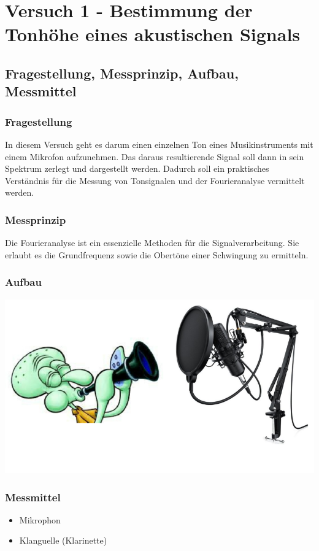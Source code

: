 \chapter{Versuch 1 - Bestimmung der Tonhöhe eines akustischen Signals}
\label{chap:VERSUCH_1}


\section{Fragestellung, Messprinzip, Aufbau, Messmittel}
\label{chap:VERSUCH_1_FRAGESTELLUNG}

\subsection*{Fragestellung}
	In diesem Versuch geht es darum einen einzelnen Ton eines Musikinstruments mit einem Mikrofon aufzunehmen.
Das daraus resultierende Signal soll dann in sein Spektrum zerlegt und dargestellt werden.
Dadurch soll ein praktisches Verständnis für die Messung von Tonsignalen und der Fourieranalyse vermittelt werden.
	
\subsection*{Messprinzip}
Die Fourieranalyse ist ein essenzielle Methoden für die Signalverarbeitung. Sie erlaubt es die Grundfrequenz sowie die Obertöne einer Schwingung zu ermitteln.

\subsection*{Aufbau}

\includegraphics[scale=0.5]{media/Versuchaufbau.png}
\label{Abb:Aufbau}


\subsection*{Messmittel}
\begin{itemize}
	\item Mikrophon
	\item Klanguelle (Klarinette)
\end{itemize}

